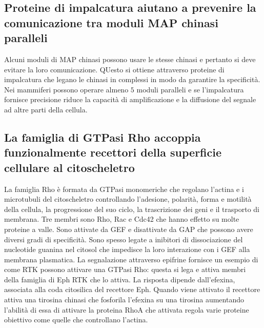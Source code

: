 \subsection{Proteine di impalcatura aiutano a prevenire la comunicazione tra moduli MAP chinasi paralleli}
Alcuni moduli di MAP chinasi possono usare le stesse chinasi e pertanto si deve evitare la loro comunicazione. QUesto si ottiene attraverso proteine di impalcatura che legano le 
chinasi in complessi in modo da garantire la specificit\`a. Nei mammiferi possono operare almeno $5$ moduli paralleli e se l'impalcatura fornisce precisione riduce la capacit\`a 
di amplificazione e la diffusione del segnale ad altre parti della cellula. 
\subsection{La famiglia di GTPasi Rho accoppia funzionalmente recettori della superficie cellulare al citoscheletro}
La famiglia Rho \`e formata da GTPasi monomeriche che regolano l'actina e i microtubuli del citoscheletro controllando l'adesione, polarit\`a, forma e motilit\`a della cellula, la 
progressione del suo ciclo, la trascrizione dei geni e il trasporto di membrana. Tre membri sono Rho, Rac e Cdc42 che hanno effetto su molte proteine a valle. Sono attivate da GEF e 
disattivate da GAP che possono avere diversi gradi di specificit\`a. Sono spesso legate a inibitori di dissociazione del nucleotide guanina nel citosol che impedisce la loro interazione
con i GEF alla membrana plasmatica. La segnalazione attraverso epifrine fornisce un esempio di come RTK possono attivare una GTPasi Rho: questa si lega e attiva membri della famiglia
di Eph RTK che lo attiva. La risposta dipende dall'efexina, associata alla coda citosilica del recettore Eph. Quando viene attivato il recettore attiva una tirosina chinasi che fosforila
l'efexina su una tirosina aumentando l'abilit\`a di essa di attivare la proteina RhoA che attivata regola varie proteine obiettivo come quelle che controllano l'actina. 

